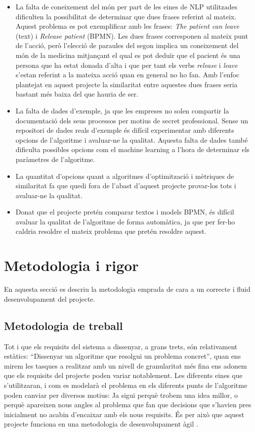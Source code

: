 \documentclass[10pt,a4paper]{article}
\begin{document}
\begin{itemize}
    \item La falta de coneixement del món per part de les eines de NLP utilitzades dificulten la possibilitat de determinar que dues frases  referint al mateix. Aquest problema es pot exemplificar amb les frases: \emph{The patient can leave} (text) i \emph{Release patient} (BPMN). Les dues frases corresponen al mateix punt de l'acció, però l'elecció de paraules del segon implica un coneixement del món de la medicina mitjançant el qual es pot deduïr que el pacient és una persona que ha estat donada d'alta i que per tant els verbs \emph{release} i \emph{leave} s'estan referint a la mateixa acció quan en general no ho fan. Amb l'enfoc plantejat en aquest projecte la similaritat entre aquestes dues frases seria bastant més baixa del que hauria de ser.
    \item La falta de dades d'exemple, ja que les empreses no solen compartir la documentació dels seus processos per motius de secret professional. Sense un repositori de dades reals d'exemple és difícil experimentar amb diferents opcions de l'algoritme i avaluar-ne la qualitat. Aquesta falta de dades també dificulta possibles opcions com el machine learning a l'hora de determinar els paràmetres de l'algoritme.
    \item La quantitat d'opcions quant a algoritmes d'optimització i mètriques de similaritat fa que quedi fora de l'abast d'aquest projecte provar-los tots i avaluar-ne la qualitat.
    \item Donat que el projecte pretén comparar textos i models BPMN, és difícil avaluar la qualitat de l'algoritme de forma automàtica, ja que per fer-ho caldria resoldre el mateix problema que pretén resoldre aquest.
\end{itemize}

\section{Metodologia i rigor}

En aquesta secció es descriu la metodologia emprada de cara a un correcte i fluid desenvolupament del projecte. 

\subsection{Metodologia de treball}

Tot i que els requisits del sistema a dissenyar, a grans trets, són relativament estàtics: ``Dissenyar un algoritme que resolgui un problema concret'', quan ens mirem les tasques a realitzar amb un nivell de granularitat més fina ens adonem que els requisits del projecte poden variar notablement. Les diferents eines que s'utilitzaran, i com es modelarà el problema en els diferents punts de l'algoritme poden canviar per diversos motius: Ja sigui perquè trobem una idea millor, o perquè apareixen nous angles al problema que fan que decisions que s'havien pres inicialment no acabin d'encaixar amb els nous requisits. És per això que aquest projecte funciona en una metodologia de desenvolupament àgil \cite{agile_manifesto}.
\end{document}
